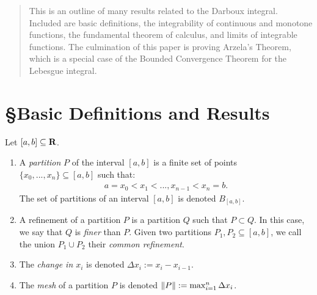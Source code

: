 \documentclass[11pt,twoside,openany]{memoir}
\begin{document}

\begin{abstract}
    This is an outline of many results related to the Darboux integral. Included are basic definitions, the integrability of continuous and monotone functions, the fundamental theorem of calculus, and limits of integrable functions. The culmination of this paper is proving Arzela's Theorem, which is a special case of the Bounded Convergence Theorem for the Lebesgue integral.
\end{abstract}

\section*{\S\:\:Basic Definitions and Results}
    \begin{definition}
        Let $[a,b] \subseteq \mathbf{R}$.
        \begin{enumerate}[label = (\arabic*),itemsep=1pt,topsep=3pt]
            \item A \textit{partition} $P$ of the interval $[a,b]$ is a finite set of points $\{x_0,...,x_n\} \subseteq [a,b]$ such that:
                \begin{equation*}
                \begin{split}
                    a = x_0 < x_1 < ... , x_{n-1} < x_n = b.
                \end{split}
                \end{equation*}
            The set of partitions of an interval $[a,b]$ is denoted $B_{[a,b]}$.
            \item A refinement of a partition $P$ is a partition $Q$ such that $P \subset Q$. In this case, we say that $Q$ is \textit{finer} than $P$. Given two partitions $P_1,P_2 \subseteq [a,b]$, we call the union $P_1 \cup P_2$ their \textit{common refinement}.
            \item The \textit{change in $x_i$} is denoted $\Delta x_i := x_{i} - x_{i-1}$.
            \item The \textit{mesh} of a partition $P$ is denoted $\left\lVert P \right\rVert := \max_{i = 1}^n \Delta x_i$.
        \end{enumerate}
    \end{definition}
\end{document}
